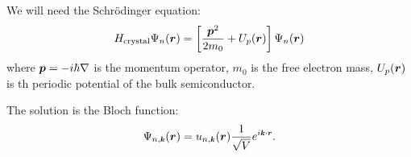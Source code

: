 We will need the Schr\"odinger equation:
\begin{equation*}
	H_{\text{crystal}} \Psi_n(\mbox{\boldmath $r$}) = \left[\frac{\mbox{\boldmath $p$}^2}{2 m_0} + U_p(\mbox{\boldmath $r$})\right] \Psi_n(\mbox{\boldmath $r$})
\end{equation*}
where $\mbox{\boldmath $p$} = - i \hbar \nabla$ is the momentum operator, $m_0$ is the free electron mass, $U_p(\mbox{\boldmath $r$})$ is th periodic potential of the bulk semiconductor.

The solution is the Bloch function:
\begin{equation*}
	\Psi_{n, \smallvc{k}}(\vc{r}) = u_{n, \smallvc{k}}(\vc{r}) \frac{1}{\sqrt{V}} e^{i \smallvc{k} \cdot \smallvc{r}}.
\end{equation*}
